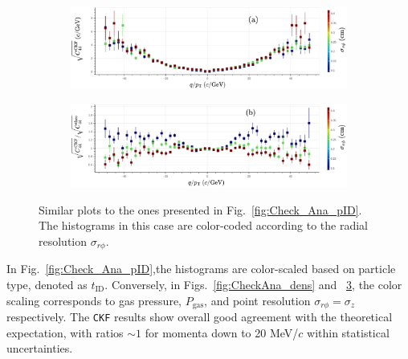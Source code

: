 \begin{figure}[!ht]
     \centering
     \begin{subfigure}[b]{0.99\textwidth}
         \centering
         \includegraphics[width=\textwidth]{figures/ch5-KF_NDGAr/ToySample/ParScan/TotVSExpVSres_noNorm_label.eps}
         \caption{}
         \label{fig:CheckAna_res_noNorm}
     \end{subfigure}
     \begin{subfigure}[b]{0.99\textwidth}
         \centering
         \includegraphics[width=\textwidth]{figures/ch5-KF_NDGAr/ToySample/ParScan/TotVSExpVSres_label.eps}
         \caption{}
         \label{fig:CheckAna_res_Norm}
     \end{subfigure}
        \caption{Similar plots to the ones presented in Fig.~\ref{fig:Check_Ana_pID}. The histograms in this case are color-coded according to the radial resolution $\sigma_{r\phi}$.}
        \label{fig:Check_Ana_res}
\end{figure} 

In Fig.~\ref{fig:Check_Ana_pID},the histograms are color-scaled based on particle type, denoted as $t_\textrm{ID}$. Conversely, in Figs.~\ref{fig:CheckAna_dens} and ~\ref{fig:Check_Ana_res}, the color scaling corresponds to gas pressure, $P_{\textrm{gas}}$, and point resolution $\sigma_{r\phi}=\sigma_z$ respectively. The \texttt{CKF} results show overall good agreement with the theoretical expectation, with ratios $\sim 1$ for momenta down to 20 MeV/$c$ within statistical uncertainties.

